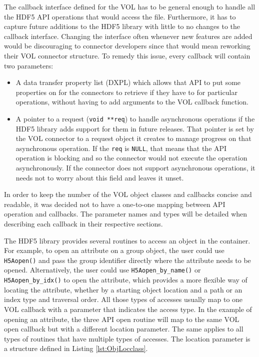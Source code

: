 The callback interface defined for the VOL has to be general enough to
handle all the HDF5 API operations that would access the
file. Furthermore, it has to capture future additions to the HDF5
library with little to no changes to the callback interface. Changing
the interface often whenever new features are added would be
discouraging to connector developers since that would mean reworking
their VOL connector structure. To remedy this issue, every callback will
contain two parameters:
\begin{itemize}
\item A data transfer property list (DXPL) which allows that API to
  put some properties on for the connectors to retrieve if they have to
  for particular operations, without having to add arguments to the
  VOL callback function.
\item A pointer to a request (\texttt{void **req}) to handle asynchronous
  operations if the HDF5 library adds support for them in future
  releases. That pointer is set by the VOL
  connector to a request object it creates to manage progress on that
  asynchronous operation. If the \texttt{req} is \texttt{NULL}, that means
  that the API operation is blocking and so the connector would not
  execute the operation asynchronously. If the connector does not support
  asynchronous operations, it needs not to worry about this field and
  leaves it unset.
\end{itemize}

In order to keep the number of the VOL object classes and callbacks
concise and readable, it was decided not to have a one-to-one mapping
between API operation and callbacks. The parameter names and types will be
detailed when describing each callback in their respective sections.

The HDF5 library provides several routines to access an object in the
container. For example, to open an attribute on a group object, the
user could use \texttt{H5Aopen()} and pass the group identifier directly
where the attribute needs to be opened. Alternatively, the user could
use \texttt{H5Aopen\_by\_name()} or \texttt{H5Aopen\_by\_idx()} to open the
attribute, which provides a more flexible way of locating the
attribute, whether by a starting object location and a path or an
index type and traversal order. All those types of accesses usually
map to one VOL callback with a parameter that indicates the access
type. In the example of opening an attribute, the three API open
routine will map to the same VOL open callback but with a different
location parameter. The same applies to all types of routines that
have multiple types of accesses.  The location parameter is a
structure defined in Listing \ref{lst:ObjLocclass}.

